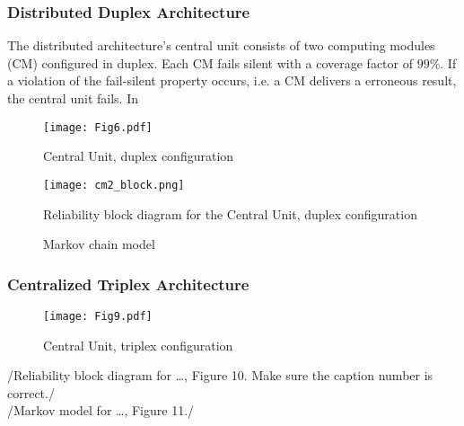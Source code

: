 \subsubsection{Distributed Duplex Architecture}
\label{subsec:dda}
The distributed architecture's central unit consists of two computing modules (CM) configured in duplex. Each CM fails silent with a coverage factor of $99\%$. If a violation of the fail-silent property occurs, i.e. a CM delivers a erroneous result, the central unit fails. In 

\begin{figure}
  \centering
  \texttt{[image: Fig6.pdf]}
  \caption{Central Unit, duplex configuration }
  \label{fig6}
\end{figure}
\begin{figure}[H]
  \centering
  \texttt{[image: cm2\_block.png]}
  \caption{Reliability block diagram for the Central Unit, duplex configuration}
  \label{fig7}
\end{figure}
\begin{figure}[h!]
  \begin{center}
  \caption{Markov chain model}
\end{center}
\end{figure}
\subsubsection{Centralized Triplex Architecture}
\label{subsec:cta}
\begin{figure}[H]
  \centering
  \texttt{[image: Fig9.pdf]}
  \caption{Central Unit, triplex configuration }
  \label{fig9}
\end{figure}
/{Reliability block diagram for …, Figure 10.  Make sure the caption number is correct.}/
\\/{Markov model for …, Figure 11.}/

